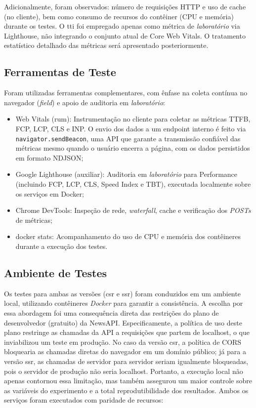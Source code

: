 Adicionalmente, foram observados: número de requisições HTTP e uso de cache (no cliente), bem como consumo de recursos do contêiner (CPU e memória) durante os testes. O \acrfull{tti} foi empregado apenas como métrica de \textit{laboratório} via Lighthouse, não integrando o conjunto atual de Core Web Vitals. O tratamento estatístico detalhado das métricas será apresentado posteriormente.

\subsection{Ferramentas de Teste}

Foram utilizadas ferramentas complementares, com ênfase na coleta contínua no navegador (\textit{field}) e apoio de auditoria em \textit{laboratório}:

\begin{itemize}
    \item Web Vitals (\acrfull{rum}): Instrumentação no cliente para coletar as métricas TTFB, FCP, LCP, CLS e INP. O envio dos dados a um endpoint interno é feito via \texttt{navigator.sendBeacon}, uma API que garante a transmissão confiável das métricas mesmo quando o usuário encerra a página, com os dados persistidos em formato NDJSON;

    \item Google Lighthouse (auxiliar): Auditoria em \textit{laboratório} para Performance (incluindo FCP, LCP, CLS, Speed Index e TBT), executada localmente sobre os serviços em Docker;
    \item Chrome DevTools: Inspeção de rede, \textit{waterfall}, cache e verificação dos \textit{POSTs} de métricas;
    \item docker stats: Acompanhamento do uso de CPU e memória dos contêineres durante a execução dos testes.
\end{itemize}

\subsection{Ambiente de Testes}


Os testes para ambas as versões (\acrshort{csr} e \acrshort{ssr}) foram conduzidos em um ambiente local, utilizando contêineres \textit{Docker} para garantir a consistência. A escolha por essa abordagem foi uma consequência direta das restrições do plano de desenvolvedor (gratuito) da NewsAPI. Especificamente, a política de uso deste plano restringe as chamadas da API a requisições que partem de localhost, o que inviabilizou um teste em produção. No caso da versão \acrshort{csr}, a política de CORS bloquearia as chamadas diretas do navegador em um domínio público; já para a versão \acrshort{ssr}, as chamadas de servidor para servidor seriam igualmente bloqueadas, pois o servidor de produção não seria localhost. Portanto, a execução local não apenas contornou essa limitação, mas também assegurou um maior controle sobre as variáveis do experimento e a total reprodutibilidade dos resultados. Ambos os serviços foram executados com paridade de recursos:

